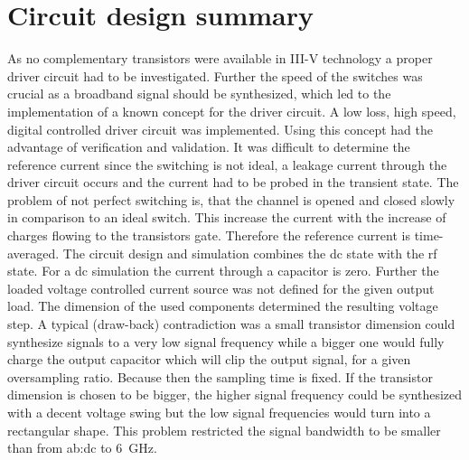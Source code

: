 \section{Circuit design summary}
As no complementary transistors were available in III-V technology a proper driver circuit had to be investigated.
Further the speed of the switches was crucial as a broadband signal should be synthesized, which led to the implementation of a known concept \cite{MaksimovicPaper} for the driver circuit.
A low loss, high speed, digital controlled driver circuit was implemented.
Using this concept had the advantage of verification and validation.
It was difficult to determine the reference current since the switching is not ideal, a leakage current through the driver circuit occurs and the current had to be probed in the transient state.
The problem of not perfect switching is, that the channel is opened and closed slowly in comparison to an ideal switch.
This increase the current with the increase of charges flowing to the transistors gate.
Therefore the reference current is time-averaged.
The circuit design and simulation combines the dc state with the rf state.
For a dc simulation the current through a capacitor is zero.
Further the loaded voltage controlled current source was not defined for the given output load.
The dimension of the used components determined the resulting voltage step.
A typical (draw-back) contradiction was a small transistor dimension could synthesize signals to a very low signal frequency while a bigger one would fully charge the output capacitor which will clip the output signal, for a given oversampling ratio.
Because then the sampling time is fixed.
If the transistor dimension is chosen to be bigger, the higher signal frequency could be synthesized with a decent voltage swing but the low signal frequencies would turn into a rectangular shape. 
This problem restricted the signal bandwidth to be smaller than from \gls{ab:dc} to \SI{6}{\GHz}.


